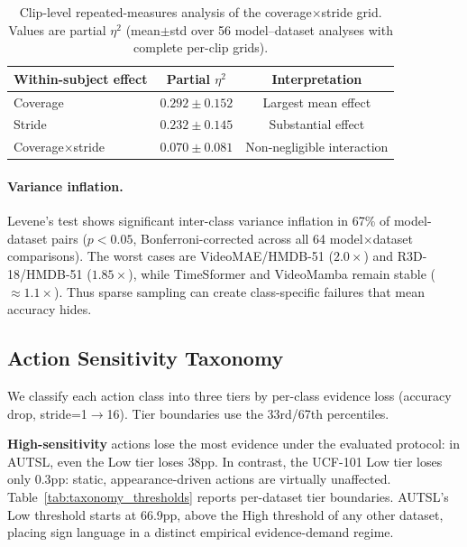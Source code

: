 \documentclass[runningheads]{llncs}
\newcommand{\tabtight}{\setlength{\tabcolsep}{3.5pt}\renewcommand{\arraystretch}{1.10}}
\newcommand{\rev}[1]{\textcolor{revblue}{#1}}
\newcommand{\revdel}[1]{}
\begin{document}
\begin{table}[t]
\centering
\caption{\rev{Clip-level repeated-measures analysis of the coverage$\times$stride grid. Values are partial $\eta^2$ (mean$\pm$std over 56 model--dataset analyses with complete per-clip grids).}}
\label{tab:anova}
\scriptsize\tabtight
\begin{tabular}{l c c}
\toprule
\rev{Within-subject effect} & \rev{Partial $\eta^2$} & \rev{Interpretation} \\
\midrule
\rev{Coverage} & \rev{$0.292 \pm 0.152$} & \rev{Largest mean effect} \\
\rev{Stride} & \rev{$0.232 \pm 0.145$} & \rev{Substantial effect} \\
\rev{Coverage$\times$stride} & \rev{$0.070 \pm 0.081$} & \rev{Non-negligible interaction} \\
\bottomrule
\end{tabular}
\end{table}

\paragraph{Variance inflation.}
Levene's test shows significant inter-class variance inflation in 67\% of model-dataset pairs ($p<0.05$, Bonferroni-corrected across all 64 model$\times$dataset comparisons). The worst cases are VideoMAE/HMDB-51 ($2.0\times$) and R3D-18/HMDB-51 ($1.85\times$), while TimeSformer and VideoMamba remain stable ($\approx1.1\times$). Thus sparse sampling can create class-specific failures that mean accuracy hides.

\subsection{Action Sensitivity Taxonomy}
\label{sec:taxonomy}

We classify each action class into three tiers by per-class \rev{evidence loss} (accuracy drop, stride=1$\to$16). Tier boundaries use the 33rd/67th percentiles.

\revdel{\textbf{High-sensitivity} actions are temporally critical: in AUTSL, even the Low tier loses 38pp, confirming that the entire dataset requires dense sampling.}\rev{\textbf{High-sensitivity} actions lose the most evidence under the evaluated protocol: in AUTSL, even the Low tier loses 38pp.} In contrast, the UCF-101 Low tier loses only 0.3pp: static, appearance-driven actions are virtually unaffected. Table~\ref{tab:taxonomy_thresholds} reports per-dataset tier boundaries. AUTSL's Low threshold starts at 66.9pp, above the High threshold of any other dataset, \rev{placing sign language in a distinct empirical evidence-demand regime}\revdel{confirming that sign language forms a distinct temporal-frequency regime}.
\end{document}
